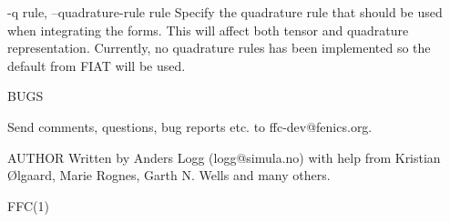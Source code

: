        -q rule, --quadrature-rule rule
              Specify the quadrature rule that should be used when integrating
              the   forms.  This   will   affect  both  tensor and  quadrature
              representation.  Currently,  no  quadrature   rules   has   been
              implemented so the default from FIAT will be used.


       BUGS

       Send comments, questions, bug reports etc. to ffc-dev@fenics.org.

AUTHOR
       Written by Anders Logg (logg@simula.no) with help from Kristian {\O}lgaard,
       Marie Rognes, Garth N. Wells and many others.


                                                                        FFC(1)
